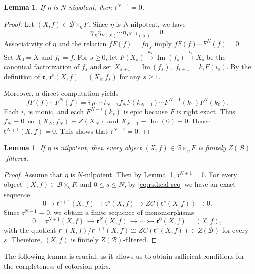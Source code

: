 \documentclass[11pt,reqno]{amsart}
\numberwithin{equation}{section}
\newtheorem{lemma}[theorem]{Lemma}
\newcommand{\cB}{\mathcal B}
\newcommand{\Ima}{\operatorname{Im}}
\newcommand{\radf}{\mathfrak r}
\begin{document}
\begin{lemma}\label{lem:nilp-radf}
If $\eta$ is $N$-nilpotent, then $\radf^{N+1}=0$.
\end{lemma}
\begin{proof}
Let $(X,f)\in\cB\ltimes_\eta F$. Since $\eta$ is $N$-nilpotent, we have
\[
\eta_X\eta_{F(X)}\cdots\eta_{F^{N-1}(X)}=0.
\]
Associativity of $\eta$ and the relation $fF(f)=f\eta_X$ imply
$
fF(f)\cdots F^N(f)=0.
$
Set $X_0=X$ and $f_0=f$. For $s\geq 0$, let
$
F(X_s)\xrightarrow{k_s}\operatorname{Im}(f_s)\xrightarrow{i_s}X_s
$
be the canonical factorization of $f_s$ and set
$
X_{s+1}=\Ima(f_s),
$
$
f_{s+1}=k_sF(i_s).
$
By the definition of $\radf$, $\radf^s(X,f)=(X_s,f_s)$ for any $s\geq 1$.

Moreover, a direct computation yields
\[
fF(f)\cdots F^N(f)
 =i_0i_1\cdots i_{N-1}
 f_NF(k_{N-1})\cdots F^{N-1}(k_1)F^N(k_0).
\]
Each $i_s$ is monic, and each $F^{N-s}(k_s)$ is epic because $F$ is right exact. Thus $f_N=0$, so $(X_N,f_N)=Z(X_N)$ and $X_{N+1}=\Ima(0)=0$.
Hence $\radf^{N+1}(X,f)=0$. This shows that $\radf^{N+1}=0$.
\end{proof}

\begin{lemma}\label{lem:nilp-Z-filt}
If $\eta$ is nilpotent, then every object $(X,f)\in \cB\ltimes_\eta F$ is finitely $Z(\cB)$-filtered.
\end{lemma}
\begin{proof}
Assume that $\eta$ is $N$-nilpotent. Then by Lemma~\ref{lem:nilp-radf}, $\radf^{N+1}=0$. For every object $(X,f)\in \cB\ltimes_\eta F$,
and $0\leq s\leq N$, by \eqref{eq:radical-seq} we have an exact sequence
\[
0\to \radf^{s+1}(X,f)\to \radf^s(X,f)\to ZC(\radf^s(X,f))\to 0.
\]
Since $\radf^{N+1}=0$, we obtain a finite sequence of monomorphisms
\[
0=\radf^{N+1}(X,f)\rightarrowtail \radf^{N}(X,f)\rightarrowtail \cdots \rightarrowtail \radf^{0}(X,f)=(X,f),
\]
with the quotient $\radf^{s}(X,f)/\radf^{s+1}(X,f)\cong ZC(\radf^s(X,f))\in Z(\cB)$ for every $s$. Therefore, $(X,f)$ is  finitely $Z(\cB)$-filtered.
\end{proof}

The following lemma is crucial, as it allows us to obtain sufficient conditions for the completeness of cotorsion pairs.
\end{document}

